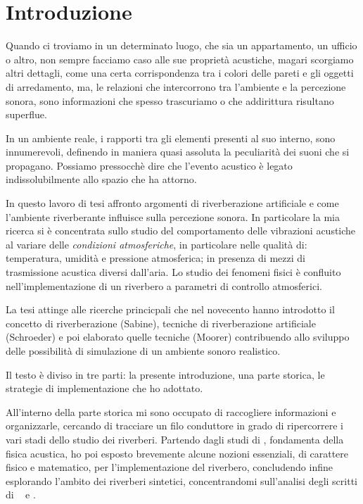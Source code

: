 \chapter*{Introduzione}
\label{chp:Introduzione}

Quando ci troviamo in un determinato luogo, che sia un appartamento, un ufficio
o altro, non sempre facciamo caso alle sue proprietà acustiche, magari scorgiamo
altri dettagli, come una certa corrispondenza tra i colori delle pareti e gli
oggetti di arredamento, ma, le relazioni che intercorrono tra l’ambiente e la
percezione sonora, sono informazioni che spesso trascuriamo o che addirittura
risultano superflue.

In un ambiente reale, i rapporti tra gli elementi presenti al suo interno, sono
innumerevoli, definendo in maniera quasi assoluta la peculiarità dei suoni che
si propagano. Possiamo pressocchè dire che l’evento acustico è legato
indissolubilmente allo spazio che ha attorno.

In questo lavoro di tesi affronto argomenti di riverberazione artificiale e
come l'ambiente riverberante influisce sulla percezione sonora. In particolare
la mia ricerca si è concentrata sullo studio del comportamento delle vibrazioni
acustiche al variare delle \emph{condizioni atmosferiche}, in particolare nelle
qualità di: temperatura, umidità e pressione atmosferica; in presenza di mezzi
di trasmissione acustica diversi dall’aria. Lo studio dei fenomeni fisici è
confluito nell'implementazione di un riverbero a parametri di controllo
atmosferici.

La tesi attinge alle ricerche princicpali che nel novecento hanno introdotto il
concetto di riverberazione (Sabine), tecniche di riverberazione artificiale
(Schroeder) e poi elaborato quelle tecniche (Moorer) contribuendo allo sviluppo
delle possibilità di simulazione di un ambiente sonoro realistico.

Il testo è diviso in tre parti: la presente introduzione, una parte storica, le
strategie di implementazione che ho adottato.

All'interno della parte storica mi sono occupato di raccogliere informazioni e
organizzarle, cercando di tracciare un filo conduttore in grado di ripercorrere
i vari stadi dello studio dei riverberi. Partendo dagli studi di \ws, fondamenta
della fisica acustica, ho poi esposto brevemente alcune nozioni essenziali, di
carattere fisico e matematico, per l'implementazione del riverbero, concludendo
infine esplorando l'ambito dei riverberi sintetici, concentrandomi sull'analisi
degli scritti di \ms~ e \jam.

